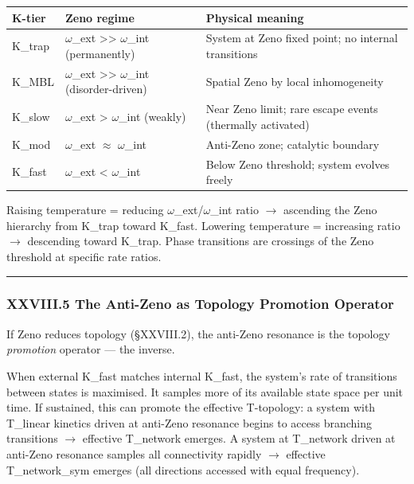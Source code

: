 \documentclass[12pt,a4paper]{article}
\begin{document}
\begin{table}[htbp]
\centering
\small
{}
\begin{tabularx}{\textwidth}{>{\centering\arraybackslash}X >{\centering\arraybackslash}X >{\centering\arraybackslash}X}
\toprule
\rowcolor{gray!25}\textbf{K-tier} & \textbf{Zeno regime} & \textbf{Physical meaning} \\
\midrule
\rowcolors{1}{white}{gray!10}
K\_trap & $\omega$\_ext \textgreater{}\textgreater{} $\omega$\_int (permanently) & System at Zeno fixed point; no internal transitions \\
K\_MBL & $\omega$\_ext \textgreater{}\textgreater{} $\omega$\_int (disorder-driven) & Spatial Zeno by local inhomogeneity \\
K\_slow & $\omega$\_ext \textgreater{} $\omega$\_int (weakly) & Near Zeno limit; rare escape events (thermally activated) \\
K\_mod & $\omega$\_ext $\approx$ $\omega$\_int & Anti-Zeno zone; catalytic boundary \\
K\_fast & $\omega$\_ext \textless{} $\omega$\_int & Below Zeno threshold; system evolves freely \\
\bottomrule
\end{tabularx}
\end{table}

Raising temperature = reducing $\omega$\_ext/$\omega$\_int ratio $\rightarrow$ ascending the Zeno hierarchy from K\_trap toward K\_fast. Lowering temperature = increasing ratio $\rightarrow$ descending toward K\_trap. Phase transitions are crossings of the Zeno threshold at specific rate ratios.

\begin{center}
\rule{0.5\textwidth}{0.4pt}
\end{center}

\subsubsection{XXVIII.5 The Anti-Zeno as Topology Promotion Operator}

If Zeno reduces topology (§XXVIII.2), the anti-Zeno resonance is the topology \emph{promotion} operator --- the inverse.

When external K\_fast matches internal K\_fast, the system's rate of transitions between states is maximised. It samples more of its available state space per unit time. If sustained, this can promote the effective T-topology: a system with T\_linear kinetics driven at anti-Zeno resonance begins to access branching transitions $\rightarrow$ effective T\_network emerges. A system at T\_network driven at anti-Zeno resonance samples all connectivity rapidly $\rightarrow$ effective T\_network\_sym emerges (all directions accessed with equal frequency).
\end{document}
